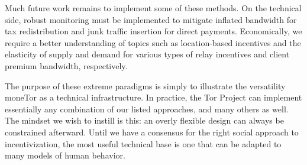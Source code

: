 Much future work remains to implement some of these methods.
On the technical side, robust monitoring must be implemented to mitigate inflated bandwidth for tax redistribution and junk traffic insertion for direct payments.
Economically, we require a better understanding of topics such as location-based incentives and the elasticity of supply and demand for various types of relay incentives and client premium bandwidth, respectively.

The purpose of these extreme paradigms is simply to illustrate the versatility moneTor as a technical infrastructure.
In practice, the Tor Project can implement essentially any combination of our listed approaches, and many others as well.
The mindset we wish to instill is this: an overly flexible design can always be constrained afterward.
Until we have a consensus for the right social approach to incentivization, the most useful technical base is one that can be adapted to many models of human behavior.

